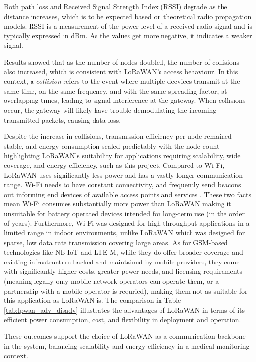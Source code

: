 Both path loss and Received Signal Strength Index (RSSI) degrade as the distance increases, which is to be expected based on theoretical radio propagation models. RSSI is a measurement of the power level of a received radio signal and is typically expressed in dBm. As the values get more negative, it indicates a weaker signal.

Results showed that as the number of nodes doubled, the number of collisions also increased, which is consistent with LoRaWAN's access behaviour. In this context, a \textit{collision} refers to the event where multiple decvices transmit at the same time, on the same frequency, and with the same spreading factor, at overlapping times, leading to signal interference at the gateway. When collisions occur, the gateway will likely have trouble demodulating the incoming transmitted packets, causing data loss.

Despite the increase in collisions, transmission efficiency per node remained stable, and energy consumption scaled predictably with the node count --- highlighting LoRaWAN's suitability for applications requiring scalability, wide coverage, and energy efficiency, such as this project. Compared to Wi-Fi, LoRaWAN uses significantly less power and has a vastly longer communication range. Wi-Fi needs to have constant connectivity, and frequently send beacons out informing end devices of available access points and services \cite{wifi_beacons}. These two facts mean Wi-Fi consumes substantially more power than LoRaWAN making it unsuitable for battery operated devices intended for long-term use (in the order of years). Furthermore, Wi-Fi was designed for high-throughput applications in a limited range in indoor environments, unlike LoRaWAN which was designed for sparse, low data rate transmission covering large areas. As for GSM-based technologies like NB-IoT and LTE-M, while they do offer broader coverage and existing infrastructure backed and maintained by mobile providers, they come with significantly higher costs, greater power needs, and licensing requirements (meaning legally only mobile network operators can operate them, or a partnership with a mobile operator is requried), making them not as suitable for this application as LoRaWAN is. The comparison in Table \ref{tab:lpwan_adv_disadv} illustrates the advantages of LoRaWAN in terms of its efficient power consumption, cost, and flexibility in deployment and operation.

These outcomes support the choice of LoRaWAN as a communication backbone in the system, balancing scalability and energy efficiency in a medical monitoring context.

